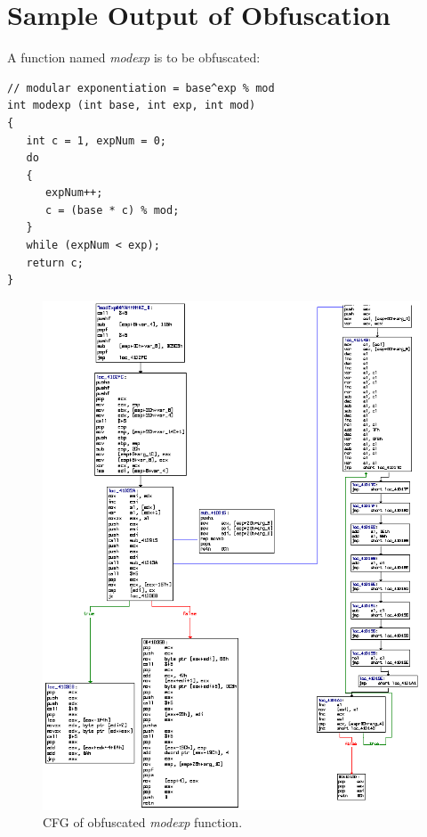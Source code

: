 \documentclass{../style/llncs}                   %
\begin{document}
%


\appendix
\section{Sample Output of Obfuscation}  \label{section_appendix}

A function named \emph{modexp} is to be obfuscated:

\begin{verbatim}
// modular exponentiation = base^exp % mod
int modexp (int base, int exp, int mod)
{
   int c = 1, expNum = 0;
   do
   {
      expNum++;
      c = (base * c) % mod;
   }
   while (expNum < exp);
   return c;
}
\end{verbatim}




\begin{figure}  \centering
\includegraphics[width=0.7\columnwidth]{./figure/fig_obf_demo_cfg}
\caption{CFG of obfuscated \emph{modexp} function.}
\label{fig_obf_demo_cfg}
\end{figure}
\end{document}
